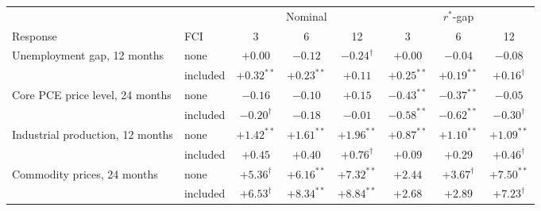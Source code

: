 \begin{tabular}{llcccccc}\toprule
 & & \multicolumn{3}{c}{Nominal} & \multicolumn{3}{c}{$r^*$-gap}\\
Response & FCI & 3 & 6 & 12 & 3 & 6 & 12\\\midrule
Unemployment gap, 12 months & none & $+0.00$ & $-0.12$ & $-0.24^{\dagger}$ & $+0.00$ & $-0.04$ & $-0.08$\\
 & included & $+0.32^{**}$ & $+0.23^{**}$ & $+0.11$ & $+0.25^{**}$ & $+0.19^{**}$ & $+0.16^{\dagger}$\\
Core PCE price level, 24 months & none & $-0.16$ & $-0.10$ & $+0.15$ & $-0.43^{**}$ & $-0.37^{**}$ & $-0.05$\\
 & included & $-0.20^{\dagger}$ & $-0.18$ & $-0.01$ & $-0.58^{**}$ & $-0.62^{**}$ & $-0.30^{\dagger}$\\
Industrial production, 12 months & none & $+1.42^{**}$ & $+1.61^{**}$ & $+1.96^{**}$ & $+0.87^{**}$ & $+1.10^{**}$ & $+1.09^{**}$\\
 & included & $+0.45$ & $+0.40$ & $+0.76^{\dagger}$ & $+0.09$ & $+0.29$ & $+0.46^{\dagger}$\\
Commodity prices, 24 months & none & $+5.36^{\dagger}$ & $+6.16^{**}$ & $+7.32^{**}$ & $+2.44$ & $+3.67^{\dagger}$ & $+7.50^{**}$\\
 & included & $+6.53^{\dagger}$ & $+8.34^{**}$ & $+8.84^{**}$ & $+2.68$ & $+2.89$ & $+7.23^{\dagger}$\\
\bottomrule\end{tabular}
